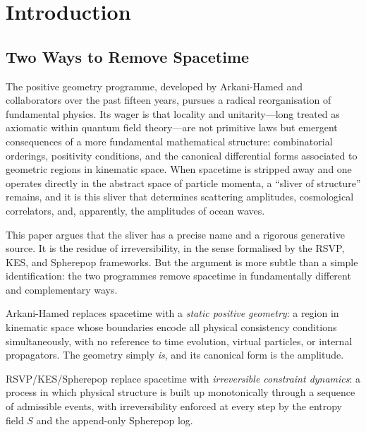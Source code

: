 \documentclass[12pt, oneside]{amsart}
\theoremstyle{plain}
\theoremstyle{definition}
\theoremstyle{remark}
\newcommand{\Sf}{S}         %
\begin{document}
\tableofcontents

\newpage

\section{Introduction}
\label{sec:intro}

\subsection{Two Ways to Remove Spacetime}

The positive geometry programme, developed by Arkani-Hamed and collaborators over the past fifteen years, pursues a radical reorganisation of fundamental physics. Its wager is that locality and unitarity---long treated as axiomatic within quantum field theory---are not primitive laws but emergent consequences of a more fundamental mathematical structure: combinatorial orderings, positivity conditions, and the canonical differential forms associated to geometric regions in kinematic space. When spacetime is stripped away and one operates directly in the abstract space of particle momenta, a ``sliver of structure'' remains, and it is this sliver that determines scattering amplitudes, cosmological correlators, and, apparently, the amplitudes of ocean waves.

This paper argues that the sliver has a precise name and a rigorous generative source. It is the residue of irreversibility, in the sense formalised by the RSVP, KES, and Spherepop frameworks. But the argument is more subtle than a simple identification: the two programmes remove spacetime in fundamentally different and complementary ways.

Arkani-Hamed replaces spacetime with a \emph{static positive geometry}: a region in kinematic space whose boundaries encode all physical consistency conditions simultaneously, with no reference to time evolution, virtual particles, or internal propagators. The geometry simply \emph{is}, and its canonical form is the amplitude.

RSVP/KES/Spherepop replace spacetime with \emph{irreversible constraint dynamics}: a process in which physical structure is built up monotonically through a sequence of admissible events, with irreversibility enforced at every step by the entropy field $\Sf$ and the append-only Spherepop log.
\end{document}
